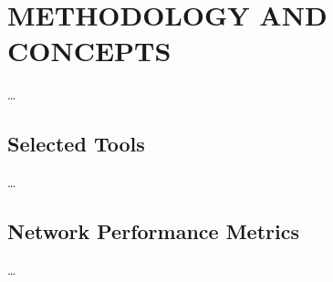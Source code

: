 
\section{METHODOLOGY AND CONCEPTS}


    \ldots

    \subsection{Selected Tools}

        \ldots

    \subsection{Network Performance Metrics}
    
        \ldots
        